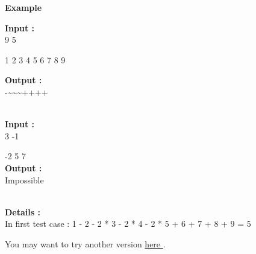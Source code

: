 \textbf{Example }
 

\textbf{Input : }
\\9 5

1 2 3 4 5 6 7 8 9

\textbf{Output : }
\\-\textasciitilde\textasciitilde\textasciitilde++++


\\\textbf{Input : }
\\3 -1

-2 5 7
\\\textbf{Output : }
\\Impossible


\\\textbf{Details : }
\\In first test case : 1 - 2 - 2 * 3 - 2 * 4 - 2 * 5 + 6 + 7 + 8 + 9 = 5

You may want to try another version \href{/problems/show/BLOPER}{ here } .